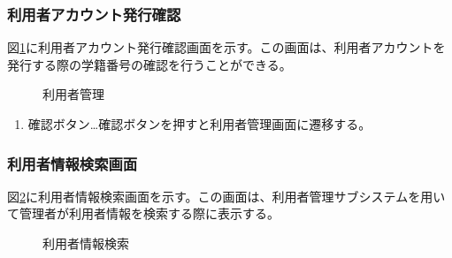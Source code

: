\documentclass[a4j]{jarticle}
\begin{document}
\subsubsection{利用者アカウント発行確認}
図\ref{fig:new_user}に利用者アカウント発行確認画面を示す。この画面は、利用者アカウントを発行する際の学籍番号の確認を行うことができる。
\begin{figure}[H]
\centering
{}
\caption{利用者管理}
\label{fig:new_user}
\end{figure}

\begin{enumerate}
  \renewcommand{\labelenumi}{\textcircled{\scriptsize \theenumi}}

\item 確認ボタン…確認ボタンを押すと利用者管理画面に遷移する。

\end{enumerate}

\subsubsection{利用者情報検索画面}
図\ref{fig:search_user}に利用者情報検索画面を示す。この画面は、利用者管理サブシステムを用いて管理者が利用者情報を検索する際に表示する。

\begin{figure}[H]
\centering
{}
\caption{利用者情報検索}
\label{fig:search_user}
\end{figure}
\end{document}
